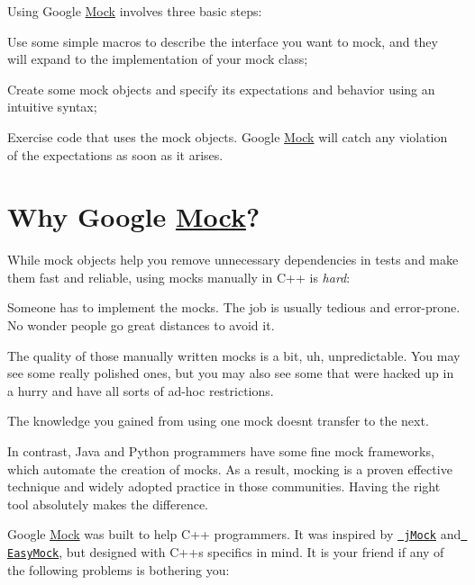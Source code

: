 Using Google \mbox{\hyperlink{classMock}{Mock}} involves three basic steps\+:


\begin{DoxyEnumerate}
\item Use some simple macros to describe the interface you want to mock, and they will expand to the implementation of your mock class;
\end{DoxyEnumerate}
\begin{DoxyEnumerate}
\item Create some mock objects and specify its expectations and behavior using an intuitive syntax;
\end{DoxyEnumerate}
\begin{DoxyEnumerate}
\item Exercise code that uses the mock objects. Google \mbox{\hyperlink{classMock}{Mock}} will catch any violation of the expectations as soon as it arises.
\end{DoxyEnumerate}

\section*{Why Google \mbox{\hyperlink{classMock}{Mock}}?}

While mock objects help you remove unnecessary dependencies in tests and make them fast and reliable, using mocks manually in C++ is {\itshape hard}\+:


\begin{DoxyItemize}
\item Someone has to implement the mocks. The job is usually tedious and error-\/prone. No wonder people go great distances to avoid it.
\item The quality of those manually written mocks is a bit, uh, unpredictable. You may see some really polished ones, but you may also see some that were hacked up in a hurry and have all sorts of ad-\/hoc restrictions.
\item The knowledge you gained from using one mock doesn\textquotesingle{}t transfer to the next.
\end{DoxyItemize}

In contrast, Java and Python programmers have some fine mock frameworks, which automate the creation of mocks. As a result, mocking is a proven effective technique and widely adopted practice in those communities. Having the right tool absolutely makes the difference.

Google \mbox{\hyperlink{classMock}{Mock}} was built to help C++ programmers. It was inspired by \href{http://www.jmock.org/}{\texttt{ j\+Mock}} and \href{http://www.easymock.org/}{\texttt{ Easy\+Mock}}, but designed with C++\textquotesingle{}s specifics in mind. It is your friend if any of the following problems is bothering you\+:


